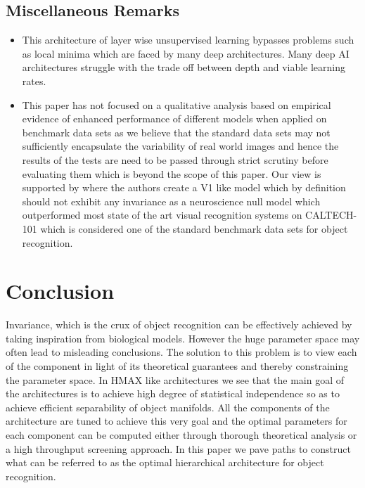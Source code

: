 \documentclass[12pt,twoside]{article}
\theoremstyle{plain}
\theoremstyle{definition}
\theoremstyle{remark}
\begin{document}
\subsection{Miscellaneous Remarks}
\begin{itemize}
\item This architecture of layer wise unsupervised learning bypasses problems such as local minima which are faced by many deep architectures. Many deep AI architectures struggle with the trade off between depth and viable learning rates.
\item This paper has not focused on a qualitative analysis based on empirical evidence of enhanced performance of different models when applied on benchmark data sets as we believe that the standard data sets may not sufficiently encapsulate the variability of real world images and hence the results of the tests are need to be passed through strict scrutiny before evaluating them which is beyond the scope of this paper. Our view is supported by \cite{NicolasPinto2008} where the authors create a V1 like model which by definition should not exhibit any invariance as a neuroscience null model which outperformed most state of the art visual recognition systems on CALTECH-101 which is considered one of the standard benchmark data sets for object recognition. 
\end{itemize}


\section{Conclusion}
\label{sec:concl}
Invariance, which is the crux of object recognition can be effectively achieved by taking inspiration from biological models. However the huge parameter space may often lead to misleading conclusions. The solution to this problem is to view each of the component in light of its theoretical guarantees and thereby constraining the parameter space. In HMAX like architectures we see that the main goal of the architectures is to achieve high degree of statistical independence so as to achieve efficient separability of object manifolds. All the components of the architecture are tuned to achieve this very goal and the optimal parameters for each component can be computed either through thorough theoretical analysis or a high throughput screening approach. In this paper we pave paths to construct what can be referred to as the optimal hierarchical architecture for object recognition.



%
%
\newpage


\end{document}
